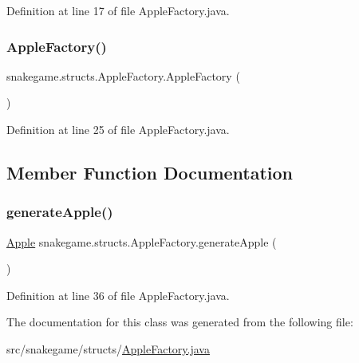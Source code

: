 Definition at line 17 of file Apple\+Factory.\+java.

\mbox{\label{classsnakegame_1_1structs_1_1_apple_factory_acc49c3b4cda4250fd4a25181b39cb36e}} 
\subsubsection{\texorpdfstring{Apple\+Factory()}{AppleFactory()}\hspace{0.1cm}{\footnotesize\ttfamily [2/2]}}
{\footnotesize\ttfamily snakegame.\+structs.\+Apple\+Factory.\+Apple\+Factory (\begin{DoxyParamCaption}{ }\end{DoxyParamCaption})}



Definition at line 25 of file Apple\+Factory.\+java.



\subsection{Member Function Documentation}
\mbox{\label{classsnakegame_1_1structs_1_1_apple_factory_a53efb1530e63916af192eb4daa0009f6}} 
\subsubsection{\texorpdfstring{generate\+Apple()}{generateApple()}}
{\footnotesize\ttfamily \mbox{\hyperlink{classsnakegame_1_1structs_1_1_apple}{Apple}} snakegame.\+structs.\+Apple\+Factory.\+generate\+Apple (\begin{DoxyParamCaption}{ }\end{DoxyParamCaption})}



Definition at line 36 of file Apple\+Factory.\+java.



The documentation for this class was generated from the following file\+:\begin{DoxyCompactItemize}
\item 
src/snakegame/structs/\mbox{\hyperlink{_apple_factory_8java}{Apple\+Factory.\+java}}\end{DoxyCompactItemize}
